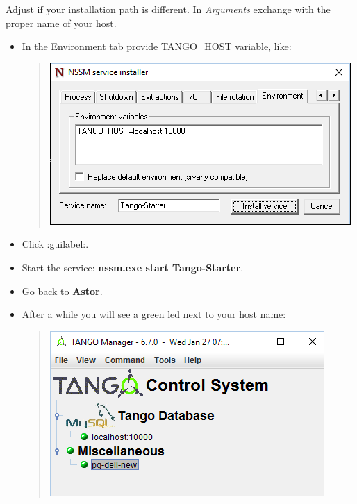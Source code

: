 \documentclass[letterpaper,10pt,english]{sphinxmanual}
\begin{document}
\begin{itemize}
\begin{description}
\begin{itemize}
\end{itemize}

Adjust if your installation path is different. In \emph{Arguments} exchange  with the proper name
of your host.
\begin{itemize}
\item {} 
In the Environment tab provide TANGO\_HOST variable, like:
\begin{quote}

\includegraphics{starter-as-service-02.png}
\end{quote}

\item {} 
Click :guilabel:.

\item {} 
Start the service: \textbf{nssm.exe start Tango-Starter}.

\item {} 
Go back to \textbf{Astor}.

\item {} 
After a while you will see a green led next to your host name:
\begin{quote}

\includegraphics{starter-02.png}
\end{quote}

\end{itemize}


\end{description}
\end{itemize}
\end{document}
